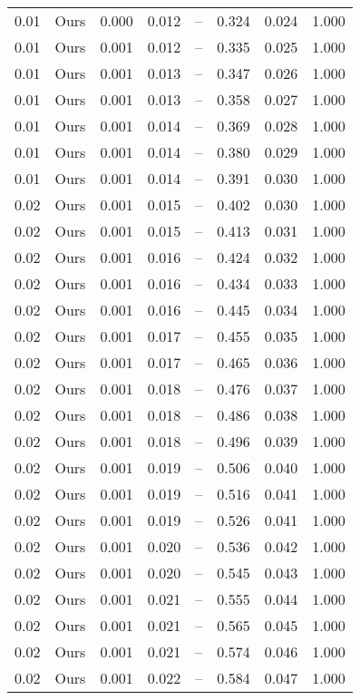 \begin{table}[H]
\begin{tabular}{l c l l l}
0.01 & Ours & 0.000 & 0.012 & -- & 0.324 & 0.024 & 1.000 \\
0.01 & Ours & 0.001 & 0.012 & -- & 0.335 & 0.025 & 1.000 \\
0.01 & Ours & 0.001 & 0.013 & -- & 0.347 & 0.026 & 1.000 \\
0.01 & Ours & 0.001 & 0.013 & -- & 0.358 & 0.027 & 1.000 \\
0.01 & Ours & 0.001 & 0.014 & -- & 0.369 & 0.028 & 1.000 \\
0.01 & Ours & 0.001 & 0.014 & -- & 0.380 & 0.029 & 1.000 \\
0.01 & Ours & 0.001 & 0.014 & -- & 0.391 & 0.030 & 1.000 \\
0.02 & Ours & 0.001 & 0.015 & -- & 0.402 & 0.030 & 1.000 \\
0.02 & Ours & 0.001 & 0.015 & -- & 0.413 & 0.031 & 1.000 \\
0.02 & Ours & 0.001 & 0.016 & -- & 0.424 & 0.032 & 1.000 \\
0.02 & Ours & 0.001 & 0.016 & -- & 0.434 & 0.033 & 1.000 \\
0.02 & Ours & 0.001 & 0.016 & -- & 0.445 & 0.034 & 1.000 \\
0.02 & Ours & 0.001 & 0.017 & -- & 0.455 & 0.035 & 1.000 \\
0.02 & Ours & 0.001 & 0.017 & -- & 0.465 & 0.036 & 1.000 \\
0.02 & Ours & 0.001 & 0.018 & -- & 0.476 & 0.037 & 1.000 \\
0.02 & Ours & 0.001 & 0.018 & -- & 0.486 & 0.038 & 1.000 \\
0.02 & Ours & 0.001 & 0.018 & -- & 0.496 & 0.039 & 1.000 \\
0.02 & Ours & 0.001 & 0.019 & -- & 0.506 & 0.040 & 1.000 \\
0.02 & Ours & 0.001 & 0.019 & -- & 0.516 & 0.041 & 1.000 \\
0.02 & Ours & 0.001 & 0.019 & -- & 0.526 & 0.041 & 1.000 \\
0.02 & Ours & 0.001 & 0.020 & -- & 0.536 & 0.042 & 1.000 \\
0.02 & Ours & 0.001 & 0.020 & -- & 0.545 & 0.043 & 1.000 \\
0.02 & Ours & 0.001 & 0.021 & -- & 0.555 & 0.044 & 1.000 \\
0.02 & Ours & 0.001 & 0.021 & -- & 0.565 & 0.045 & 1.000 \\
0.02 & Ours & 0.001 & 0.021 & -- & 0.574 & 0.046 & 1.000 \\
0.02 & Ours & 0.001 & 0.022 & -- & 0.584 & 0.047 & 1.000 \\

\end{tabular}
\end{table}

